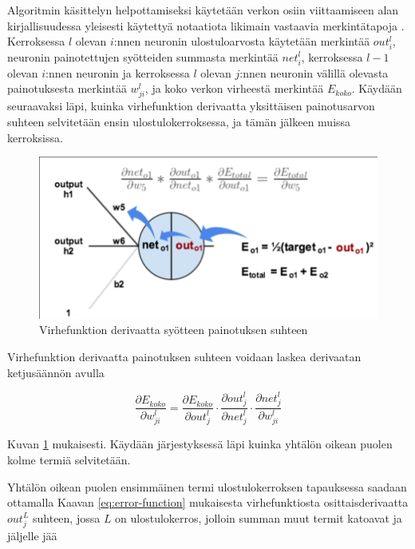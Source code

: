 \documentclass[finnish]{tktltiki2}
\theoremstyle{definition}
\theoremstyle{remark}
\begin{document}
    Algoritmin käsittelyn helpottamiseksi käytetään verkon osiin viittaamiseen alan kirjallisuudessa yleisesti käytettyä notaatiota likimain vastaavia merkintätapoja \cite{Nielsen-neural}\cite{Rojas96}. Kerroksessa $l$ olevan $i$:nnen neuronin ulostuloarvosta käytetään merkintää $out_i^l$, neuronin painotettujen syötteiden summasta merkintää $net_i^l$, kerroksessa $l-1$ olevan $i$:nnen neuronin ja kerroksessa $l$ olevan $j$:nnen neuronin välillä olevasta painotuksesta merkintää $w_{ji}^l$, ja koko verkon virheestä merkintää $E_{koko}$. Käydään seuraavaksi läpi, kuinka virhefunktion derivaatta yksittäisen painotusarvon suhteen selvitetään ensin ulostulokerroksessa, ja tämän jälkeen muissa kerroksissa.



    \begin{figure}[h]
      \centering
      \includegraphics[scale=0.4]{chain-rule}
      \caption{Virhefunktion derivaatta syötteen painotuksen suhteen}
      \label{pic:chain-rule}
    \end{figure}

    Virhefunktion derivaatta painotuksen suhteen voidaan laskea derivaatan ketjusäännön avulla

    $$ \frac{\partial E_{koko}}{\partial w_{ji}^l} = \frac{\partial E_{koko}}{\partial out_j^{l}} \cdot \frac{\partial out_j^{l}}{\partial net_j^{l}} \cdot \frac{\partial net_j^{l}}{\partial w_{ji}^l}$$

    \noindent Kuvan \ref{pic:chain-rule} mukaisesti. Käydään järjestyksessä läpi kuinka yhtälön oikean puolen kolme termiä selvitetään. 
    
    Yhtälön oikean puolen ensimmäinen termi ulostulokerroksen tapauksessa saadaan ottamalla Kaavan \ref{eq:error-function} mukaisesta virhefunktiosta osittaisderivaatta $out_j^{L}$ suhteen, jossa $L$ on ulostulokerros, jolloin summan muut termit katoavat ja jäljelle jää 
\end{document}
